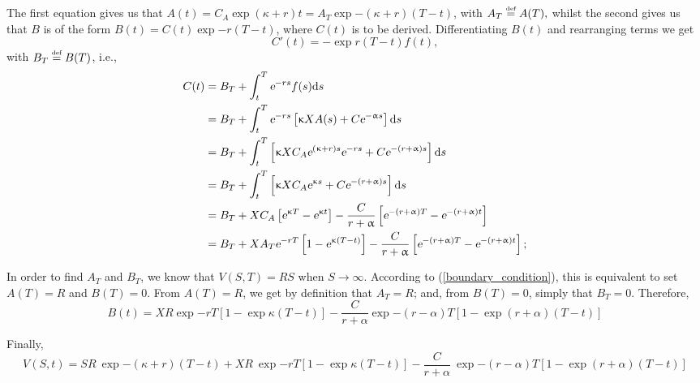 The first equation gives us that $A(t) = C_A \exp{(\kappa + r) t} = A_T \exp{-(\kappa + r)(T-t)}$, with 
$
A_T \overset{\text{\tiny def}}{=} A(T),
$ 
whilst the second gives us that $B$ is of the form $B(t) = C(t) \exp{-r (T-t)}$, where $C(t)$ is to be derived. Differentiating $B(t)$ and rearranging terms we get
	\begin{equation}
		C'(t) = - \exp{r(T-t)}f(t), 
	\end{equation}
with $  B_T \overset{\text{\tiny def}}{=} B(T)$, i.e.,
	$$
		\begin{aligned}
			  C(t) 	&= B_T + \int_t^T \text{\sl e}^{-rs}f(s)\text{\rm d} s\\
					&= B_T + \int_t^T \text{\sl e}^{-rs}\left[\upkappa X A(s) + C\text{\sl e}^{-\upalpha s}\right]\text{\rm d} s\\
					&= B_T + \int_t^T \left[\upkappa XC_A \text{\sl e}^{(\upkappa + r) s} \text{\sl e}^{-rs} + C\text{\sl e}^{-(r+\upalpha)s}\right]\text{\rm d} s\\
					&= B_T + \int_t^T \left[\upkappa XC_A \text{\sl e}^{\upkappa s} + C\text{\sl e}^{-(r+\upalpha)s}\right]\text{\rm d} s\\
					&= B_T + {X C_A} \left[\text{\sl e}^{\upkappa T} - \text{\sl e}^{\upkappa t}\right] - \frac{C}{r+\upalpha}\left[\text{\sl e}^{-(r+\upalpha)T}-\text{\sl e}^{-(r+\upalpha)t}\right]\\
					&= B_T + {X A_T\text{\sl e}^{-rT}} \left[1 -  \text{\sl e}^{\upkappa (T-t)}\right]- \frac{C}{r+\upalpha}\left[\text{\sl e}^{-(r+\upalpha)T}-\text{\sl e}^{-(r+\upalpha)t}\right] ;
		\end{aligned}
	$$

In order to find $A_T$ and $B_T$, we know that $V(S, T) = RS$ when $S\to\infty$. According to (\ref{boundary_condition}), this is equivalent to set $A(T) = R$ and $B(T) = 0$. From $A(T) = R$, we get by definition that $A_T = R$; and, from $B(T) = 0$, simply that $B_T = 0$. Therefore,
	\begin{equation}
		B(t) = {X R\exp{-rT}} \left[1 -  \exp{\kappa (T-t)}\right]- \frac{C}{r+\alpha}\exp{-(r-\alpha)T}\left[1-\exp{(r+\alpha)(T-t)}\right]
	\end{equation}

Finally,
	\begin{equation}\label{boundary_formula}
		V(S,t) = SR  \ \exp{-(\kappa + r)(T-t)} +  X R \ \exp{-rT} \left[1 -  \exp{\kappa (T-t)}\right]- \frac{C}{r+\alpha}\ \exp{-(r-\alpha)T}\left[1-\exp{(r+\alpha)(T-t)}\right]
	\end{equation}
